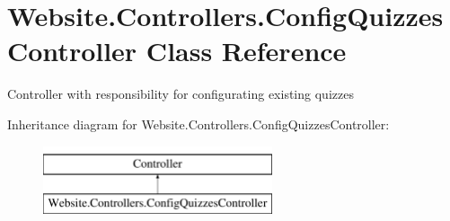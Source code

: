 \hypertarget{class_website_1_1_controllers_1_1_config_quizzes_controller}{}\section{Website.\+Controllers.\+Config\+Quizzes\+Controller Class Reference}
\label{class_website_1_1_controllers_1_1_config_quizzes_controller}


Controller with responsibility for configurating existing quizzes  


Inheritance diagram for Website.\+Controllers.\+Config\+Quizzes\+Controller\+:\begin{figure}[H]
\begin{center}
\leavevmode
\includegraphics[height=2.000000cm]{class_website_1_1_controllers_1_1_config_quizzes_controller}
\end{center}
\end{figure}

